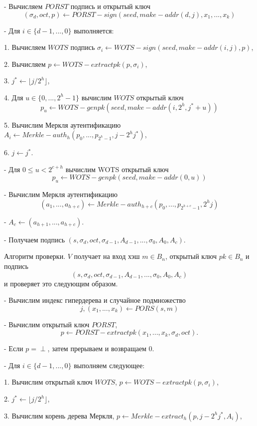 \documentclass[a4paper, 14pt]{extarticle}
\begin{document}
- Вычисляем $PORST$ подпись и открытый ключ
\[(\sigma_{d}, oct, p) \leftarrow PORST-sign(seed, make-addr(d, j), x_{1}, ..., x_{k})\]

- Для $i \in \{d - 1, ..., 0\}$ выполняется:

1. Вычисляем $WOTS$ подпись $\sigma_{i} \leftarrow WOTS-sign(seed, make-addr(i,j),p)$,

2. Вычисляем $p \leftarrow WOTS-extractpk(p, \sigma_{i})$,

3. $j^{*} \leftarrow \lfloor j / 2^{h} \rfloor$,

4. Для $u \in \{0, ..., 2^{h} - 1\}$ вычислим $WOTS$ открытый ключ
\[p_{u} \leftarrow WOTS-genpk(seed, make-addr(i, 2^{h}, j^{*} + u))\]

5. Вычислим Меркля аутентификацию $A_{i} \leftarrow Merkle-auth_{h}(p_{0}, ..., p_{2^{h} - 1}, j - 2^{h}j^{*})$,

6. $j \leftarrow j^{*}$.

- Для $0 \leq u < 2^{c+h}$ вычислим WOTS открытый ключ
\[p_{u} \leftarrow WOTS-genpk(seed, make-addr(0, u))\]

- Вычислим Меркля аутентификацию
\[(a_{1}, ..., a_{h+c}) \leftarrow Merkle-auth_{h+c}(p_{0}, ..., p_{2^{h+c} - 1}, 2^{h}j)\]

- $A_{c} \leftarrow (a_{h+1}, ..., a_{h+c})$.

- Получаем подпись $(s, \sigma_{d}, oct, \sigma_{d - 1}, A_{d - 1}, ..., \sigma_{0}, A_{0}, A_{c})$.

Алгоритм проверки. $V$ получает на вход хэш $m \in B_{n}$, открытый ключ $pk \in B_{n}$ и подпись
\[(s, \sigma_{d}, oct, \sigma_{d - 1}, A_{d - 1}, ..., \sigma_{0}, A_{0}, A_{c})\]
и проверяет это следующим образом.

- Вычислим индекс гипердерева и случайное подмножество
\[j, (x_{1}, ..., x_{k}) \leftarrow PORS(s,m)\]

- Вычислим открытый ключ $PORST$,
\[p \leftarrow PORST-extractpk(x_{1}, ..., x_{k}, \sigma_{d}, oct).\]

- Если $p = \perp$, затем прерываем и возвращаем 0.

- Для $i \in \{d - 1, ..., 0\}$ выполняем следующее:

1. Вычислим открытый ключ $WOTS$, $p \leftarrow WOTS-extractpk(p, \sigma_{i})$,

2. $j^{*} \leftarrow \lfloor j/2^{h} \rfloor$,

3. Вычислим корень дерева Меркля, $p \leftarrow Merkle-extract_{h}(p, j - 2^{h}j^{*}, A_{i})$,
\end{document}
